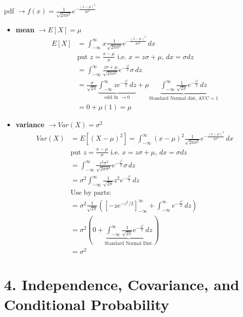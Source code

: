 \documentclass[11pt,a4paper]{article}
\begin{document}
pdf $\rightarrow f(x) = \frac{1}{\sqrt{2\pi\sigma^2}} e^{-\frac{(x-\mu)^2}{2\sigma^2}}$
\begin{itemize}
    \item \textbf{mean $\rightarrow E[X] = \mu$}
    \begin{align*}
        E[X] &= \int_{-\infty}^\infty x \frac{1}{\sqrt{2\pi\sigma^2}} e^{-\frac{(x-\mu)^2}{2\sigma^2}} \, dx \\
        &\text{put } z = \frac{x-\mu}{\sigma} \text{ i.e. } x = z\sigma + \mu, \, dx = \sigma dz \\
        &= \int_{-\infty}^\infty \frac{z\sigma + \mu}{\sqrt{2\pi\sigma^2}} e^{-\frac{z^2}{2}} \sigma \, dz \\
        &= \frac{\sigma}{\sqrt{2\pi}} \underbrace{\int_{-\infty}^\infty z e^{-\frac{z^2}{2}} \, dz}_{\text{odd fn } \rightarrow 0} + \mu \underbrace{\int_{-\infty}^\infty \frac{1}{\sqrt{2\pi}} e^{-\frac{z^2}{2}} \, dz}_{\text{Standard Normal dist, AUC}=1} \\
        &= 0 + \mu(1) = \mu
    \end{align*}

    \item \textbf{variance $\rightarrow Var(X) = \sigma^2$}
    \begin{align*}
        Var(X) &= E[(X-\mu)^2] = \int_{-\infty}^\infty (x-\mu)^2 \frac{1}{\sqrt{2\pi\sigma^2}} e^{-\frac{(x-\mu)^2}{2\sigma^2}} \, dx \\
        &\text{put } z = \frac{x-\mu}{\sigma} \text{ i.e. } x = z\sigma + \mu, \, dx = \sigma dz \\
        &= \int_{-\infty}^\infty \frac{z^2 \sigma^2}{\sqrt{2\pi\sigma^2}} e^{-\frac{z^2}{2}} \sigma \, dz \\
        &= \sigma^2 \int_{-\infty}^\infty \frac{1}{\sqrt{2\pi}} z^2 e^{-\frac{z^2}{2}} \, dz \\
        &\text{Use by parts:} \\
        &= \sigma^2 \frac{1}{\sqrt{2\pi}} \left( \left[ -z e^{-z^2/2} \right]_{-\infty}^\infty + \int_{-\infty}^\infty e^{-\frac{z^2}{2}} \, dz \right) \\
        &= \sigma^2 \left( 0 + \underbrace{\int_{-\infty}^\infty \frac{1}{\sqrt{2\pi}} e^{-\frac{z^2}{2}} \, dz}_{\text{Standard Normal Dist.}} \right) \\
        &= \sigma^2
    \end{align*}
\end{itemize}

\section*{\textcolor{secondary}{4. Independence, Covariance, and Conditional Probability}}
\end{document}
